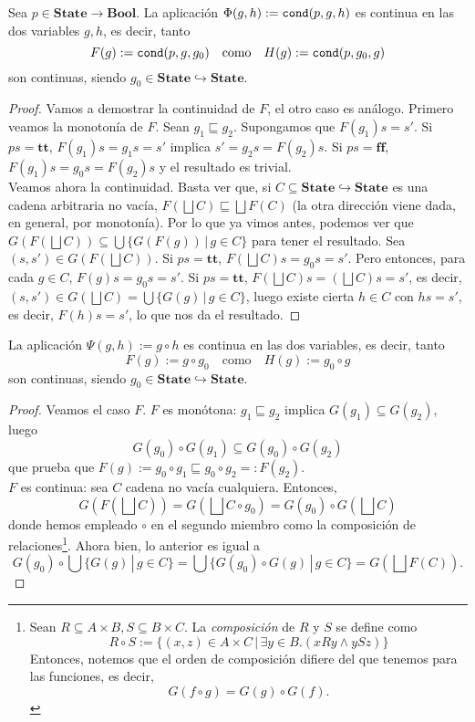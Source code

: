 \begin{lema}
Sea $p \in \mathbf{State}\to\mathbf{Bool}$. La aplicación $\Phi(g, h) := \texttt{cond}(p, g, h)$ es continua en las dos variables $g, h$, es decir, tanto
$$F(g) := \texttt{cond}(p, g, g_0) \quad \text{como} \quad H(g) := \texttt{cond}(p, g_0, g)$$
son continuas, siendo $g_0 \in \mathbf{State}\hookrightarrow\mathbf{State}$.
\end{lema}
\begin{proof}
Vamos a demostrar la continuidad de $F$, el otro caso es análogo. Primero veamos la monotonía de $F$. Sean $g_1 \sqsubseteq g_2$. Supongamos que $F(g_1)s = s'$. Si $ps = \mathbf{tt}$, $F(g_1)s = g_1s = s'$ implica $s' = g_2s = F(g_2)s$. Si $ps = \mathbf{ff}$, $F(g_1)s = g_0s = F(g_2)s$ y el resultado es trivial.
\\

Veamos ahora la continuidad. Basta ver que, si $C \subseteq \mathbf{State}\hookrightarrow\mathbf{State}$ es una cadena arbitraria no vacía, $F(\bigsqcup C) \sqsubseteq \bigsqcup F(C)$ (la otra dirección viene dada, en general, por monotonía). Por lo que ya vimos antes, podemos ver que $G(F(\bigsqcup C)) \subseteq \bigcup \{G(F(g)) \, | \, g \in C\}$ para tener el resultado. Sea $(s, s')\in G(F(\bigsqcup C))$. Si $ps = \mathbf{tt}$, $F(\bigsqcup C)s = g_0s= s'$. Pero entonces, para cada $g \in C$, $F(g)s = g_0s = s'$. Si $ps = \mathbf{tt}$, $F(\bigsqcup C)s = (\bigsqcup C)s = s'$, es decir, $(s, s')\in G(\bigsqcup C) = \bigcup \{G(g) \, | \, g \in C\}$, luego existe cierta $h \in C$ con $hs = s'$, es decir, $F(h)s = s'$, lo que nos da el resultado.
\end{proof}

\begin{lema}
La aplicación $\Psi(g, h) := g \circ h$ es continua en las dos variables, es decir, tanto
$$F(g) := g \circ g_0\quad \text{como}\quad H(g) := g_0 \circ g$$
son continuas, siendo $g_0 \in \mathbf{State}\hookrightarrow\mathbf{State}$.
\end{lema}
\begin{proof}
Veamos el caso $F$. $F$ es monótona: $g_1 \sqsubseteq g_2$ implica $G(g_1)\subseteq G(g_2)$, luego
$$G(g_0)\circ G(g_1) \subseteq G(g_0)\circ G(g_2)$$
que prueba que $F(g):=g_0\circ g_1\sqsubseteq g_0\circ g_2 =: F(g_2)$.
\\
$F$ es continua: sea $C$ cadena no vacía cualquiera. Entonces, 
$$G\left(F\left(\bigsqcup C\right)\right) = G\left(\bigsqcup C \circ g_0\right) = G(g_0)\circ G\left(\bigsqcup C\right)$$
donde hemos empleado $\circ$ en el segundo miembro como la composición de relaciones\footnote{Sean $R \subseteq A \times B, S \subseteq B \times C$. La \textit{composición} de $R$ y $S$ se define como
$$R \circ S := \{(x, z) \in A \times C \, | \, \exists y \in B.(xRy \land ySz)\}$$
Entonces, notemos que el orden de composición difiere del que tenemos para las funciones, es decir, $$G(f \circ g) = G(g) \circ G(f).$$}.
Ahora bien, lo anterior es igual a
$$G(g_0)\circ \bigcup \{G(g) \, | \, g \in C\} = \bigcup \{G(g_0)\circ G(g) \, | \, g \in C\} = G\left(\bigsqcup F(C)\right).$$
\end{proof}


